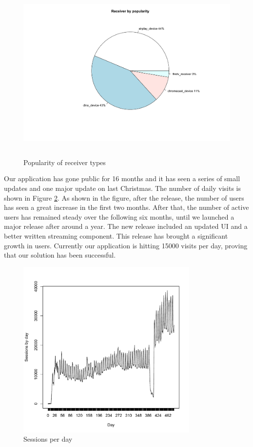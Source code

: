 \begin{figure}[hb]
\centering \includegraphics[height=9cm]{charts/receiver_popularity}
\caption{Popularity of receiver types \label{receiver_types}}
\end{figure}
Our application has gone public for 16 months and it has seen a series of small updates and one major update on last Christmas. The number of daily visits is shown in Figure \ref{sessions_perday}. As shown in the figure, after the release, the number of users has seen a great increase in the first two months. After that, the number of active users has remained steady over the following six months, until we launched a major release after around a year. The new release included an updated UI and a better written streaming component. This release has brought a significant growth in users. Currently our application is hitting 15000 visits per day,  proving that our solution has been successful.
\begin{figure}[hb]
\centering \includegraphics[height=9cm]{charts/sessions_per_day}
\caption{Sessions per day \label{sessions_perday}}
\end{figure}

